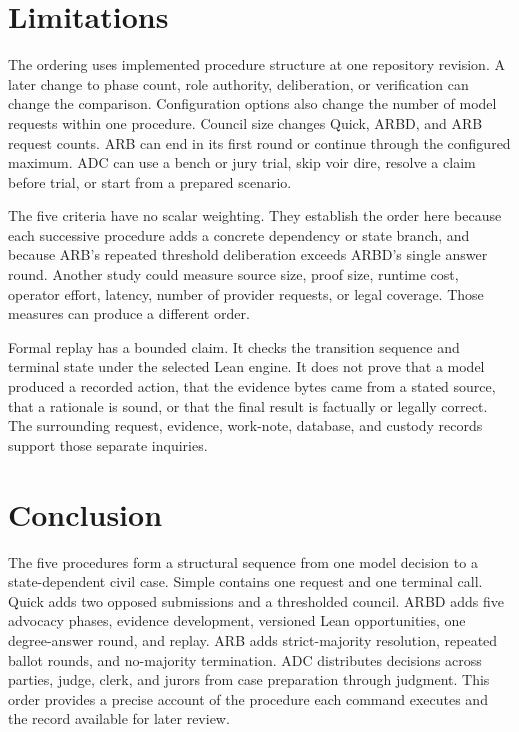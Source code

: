 \documentclass[11pt]{article}
\begin{document}
\section{Limitations}

The ordering uses implemented procedure structure at one repository revision.  A later change to phase count, role authority, deliberation, or verification can change the comparison.  Configuration options also change the number of model requests within one procedure.  Council size changes Quick, ARBD, and ARB request counts.  ARB can end in its first round or continue through the configured maximum.  ADC can use a bench or jury trial, skip voir dire, resolve a claim before trial, or start from a prepared scenario.

The five criteria have no scalar weighting.  They establish the order here because each successive procedure adds a concrete dependency or state branch, and because ARB's repeated threshold deliberation exceeds ARBD's single answer round.  Another study could measure source size, proof size, runtime cost, operator effort, latency, number of provider requests, or legal coverage.  Those measures can produce a different order.

Formal replay has a bounded claim.  It checks the transition sequence and terminal state under the selected Lean engine.  It does not prove that a model produced a recorded action, that the evidence bytes came from a stated source, that a rationale is sound, or that the final result is factually or legally correct.  The surrounding request, evidence, work-note, database, and custody records support those separate inquiries.

\section{Conclusion}

The five procedures form a structural sequence from one model decision to a state-dependent civil case.  Simple contains one request and one terminal call.  Quick adds two opposed submissions and a thresholded council.  ARBD adds five advocacy phases, evidence development, versioned Lean opportunities, one degree-answer round, and replay.  ARB adds strict-majority resolution, repeated ballot rounds, and no-majority termination.  ADC distributes decisions across parties, judge, clerk, and jurors from case preparation through judgment.  This order provides a precise account of the procedure each command executes and the record available for later review.
\end{document}
